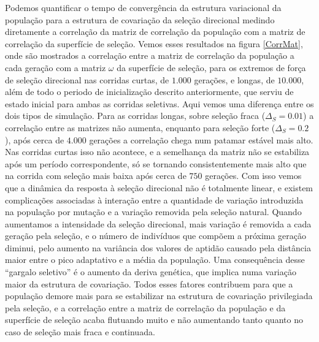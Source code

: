 Podemos quantificar o tempo de convergência da estrutura variacional da
população para a estrutura de covariação da seleção direcional medindo
diretamente a correlação da matriz de correlação da população com a
matriz de correlação da superfície de seleção.
Vemos esses resultados na figura \ref{CorrMat}, onde são mostrados a
correlação entre a matriz de correlação da população a cada geração com
a matriz $\omega$ da superfície de seleção, para os
extremos de força de seleção direcional nas corridas curtas, de $1.000$
gerações, e longas, de $10.000$, além de todo o periodo de inicialização
descrito anteriormente, que serviu de estado inicial para ambas as
corridas seletivas.
Aqui vemos uma diferença entre os dois tipos  de simulação.
Para as corridas longas, sobre seleção fraca ($\Delta_S = 0.01$) a
correlação entre as matrizes não aumenta, enquanto para seleção forte
($\Delta_S = 0.2$), após cerca de $4.000$ gerações a correlação chega
num patamar estável mais alto.
Nas corridas curtas isso não acontece, e a semelhança da matriz não se
estabiliza após um período correspondente, só se tornando
consistentemente mais alto que na corrida com seleção mais baixa após
cerca de $750$ gerações.
Com isso vemos que a dinâmica da resposta à seleção direcional não é
totalmente linear, e existem complicações associadas à
interação entre a quantidade de variação introduzida na população por
mutação e a variação removida pela seleção natural.
Quando aumentamos a intensidade da seleção direcional, mais variação é
removida a cada geração pela seleção, e o número de indivíduos que
compõem a próxima geração diminui, pelo aumento na variância dos valores
de aptidão causado pela distância maior entre o pico adaptativo e a
média da população.
Uma consequência desse ``gargalo seletivo'' é o aumento da deriva genética,
que implica numa variação maior da estrutura de covariação.
Todos esses fatores contribuem para que a população demore mais para se
estabilizar na estrutura de covariação privilegiada pela seleção, e a
correlação entre a matriz de correlação da população e da superfície de
seleção acaba flutuando muito e não aumentando tanto quanto no caso de
seleção mais fraca e continuada.

